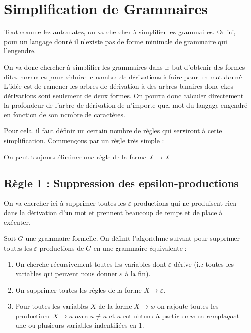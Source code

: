 
\section{Simplification de Grammaires}

Tout comme les automates, on va chercher à simplifier les grammaires. 
Or ici, pour un langage donné il n'existe pas de forme minimale de grammaire qui l'engendre.

On va donc chercher à simplifier les grammaires dans le but d'obtenir des formes dites normales 
pour réduire le nombre de dérivations à faire pour un mot donné. L'idée est de ramener les arbres de dérivation 
à des arbres binaires donc ekes dérivations sont seulement de deux formes. 
On pourra donc calculer directement la profondeur de l'arbre de dérivation de n'importe quel mot du langage
engendré en fonction de son nombre de caractères. 

Pour cela, il faut définir un certain nombre de règles qui serviront à cette simplification. 
Commençons par un règle très simple : 

\begin{definition}[Règle 0]
    On peut toujours éliminer une règle de la forme $ X \longrightarrow X$. 
\end{definition}

\subsection{Règle 1 : Suppression des epsilon-productions}

On va chercher ici à supprimer toutes les $\varepsilon$ productions qui ne produisent rien dans la 
dérivation d'un mot et prennent beaucoup de temps et de place à exécuter. 

\begin{definition}
    Soit $G$ une grammaire formelle. On définit l'algorithme suivant pour 
    supprimer toutes les $\varepsilon$-productions de $ G$ en une grammaire équivalente : 
    \begin{enumerate}
        \item On cherche récursivement toutes les variables dont $\varepsilon$ dérive
        (i.e toutes les variables qui peuvent nous donner $\varepsilon$ à la fin). 
        \item On supprimer toutes les règles de la forme $X \longrightarrow \varepsilon$. 
        \item Pour toutes les variables $X$ de la forme $X \longrightarrow w$ 
        on rajoute toutes les productions $X \longrightarrow u$ avec $ u \not = u$ et $u$ est 
        obtenu à partir de $w$ en remplaçant une ou plusieurs variables indentifiées en 1. 
    \end{enumerate}
\end{definition}

